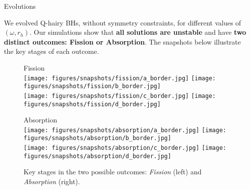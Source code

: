 \begin{block}{Evolutions}

We evolved Q-hairy \glspl{BH}, without symmetry constraints, for different values of $(\omega, r_h)$. Our simulations show that \textbf{all solutions are unstable} and have \textbf{two distinct outcomes: Fission or Absorption}. The snapshots below illustrate the key stages of each outcome.

\begin{figure}[H]
    \centering
    \begin{minipage}[t]{0.49\textwidth}
        \centering
        {\large \Raleway \phantom{p} \textmd{Fission} \phantom{p}} \\  %
        \vspace{0.75em}
        \texttt{[image: figures/snapshots/fission/a\_border.jpg]}
        \texttt{[image: figures/snapshots/fission/b\_border.jpg]}\\[0.4ex]
        \texttt{[image: figures/snapshots/fission/c\_border.jpg]}
        \texttt{[image: figures/snapshots/fission/d\_border.jpg]}
    \end{minipage}
    \hfill
    \begin{minipage}[t]{0.49\textwidth}
        \centering
        {\large \Raleway \textmd{Absorption}} \\
        \vspace{0.75em}
        \texttt{[image: figures/snapshots/absorption/a\_border.jpg]}
        \texttt{[image: figures/snapshots/absorption/b\_border.jpg]}\\[0.4ex]
        \texttt{[image: figures/snapshots/absorption/c\_border.jpg]}
        \texttt{[image: figures/snapshots/absorption/d\_border.jpg]}
    \end{minipage}
    \caption{Key stages in the two possible outcomes: \textit{Fission} (left) and \textit{Absorption} (right).}
\end{figure}

\end{block}
